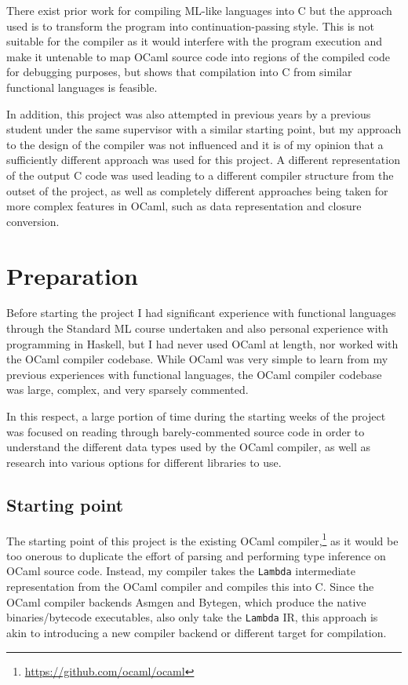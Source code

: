 There exist prior work for compiling ML-like languages into C
\cite{noassemblyrequired} but the approach used is to transform the program into
continuation-passing style. This is not suitable for the compiler as it would
interfere with the program execution and make it untenable to map OCaml source
code into regions of the compiled code for debugging purposes, but shows that
compilation into C from similar functional languages is feasible.

In addition, this project was also attempted in previous years by a previous
student \cite{previousproject} under the same supervisor with a similar starting
point, but my approach to the design of the compiler was not influenced and it
is of my opinion that a sufficiently different approach was used for this
project. A different representation of the output C code was used leading to a
different compiler structure from the outset of the project, as well as
completely different approaches being taken for more complex features in OCaml,
such as data representation and closure conversion.

\chapter{Preparation}

Before starting the project I had significant experience with functional
languages through the Standard ML course undertaken and also personal experience
with programming in Haskell, but I had never used OCaml at length, nor worked
with the OCaml compiler codebase. While OCaml was very simple to learn from my
previous experiences with functional languages, the OCaml compiler codebase was
large, complex, and very sparsely commented.

In this respect, a large portion of time during the starting weeks of the 
project was focused on reading through barely-commented source code in order to
understand the different data types used by the OCaml compiler, as well as
research into various options for different libraries to use.

\section{Starting point}

The starting point of this project is the existing OCaml
compiler,\footnote{\url{https://github.com/ocaml/ocaml}} as it would be too
onerous to duplicate the effort of parsing and performing type inference on
OCaml source code. Instead, my compiler takes the \texttt{Lambda} intermediate
representation from the OCaml compiler and compiles this into C. Since the OCaml
compiler backends Asmgen and Bytegen, which produce the native binaries/bytecode
executables, also only take the \texttt{Lambda} IR, this approach is akin to
introducing a new compiler backend or different target for compilation.

